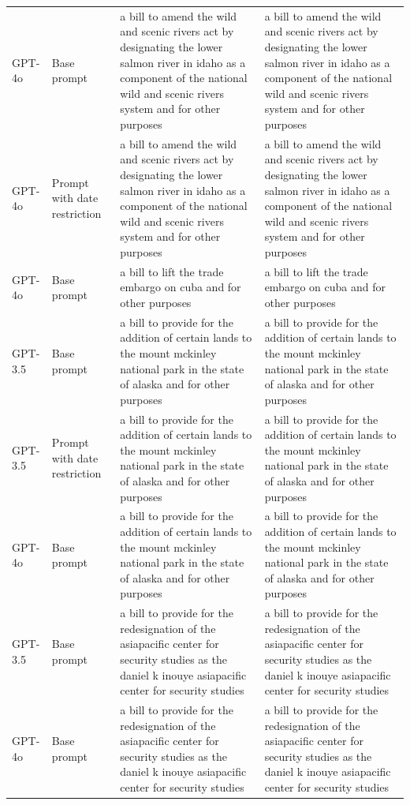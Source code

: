 \begin{longtable}{>{\raggedright\arraybackslash}p{1.4cm}>{\raggedright\arraybackslash}p{1.4cm}>{\raggedright\arraybackslash}p{5.5cm}>{\raggedright\arraybackslash}p{5.5cm}}
GPT-4o & Base prompt & a bill to amend the wild and scenic rivers act by designating the lower salmon river in idaho as a component of the national wild and scenic rivers system and for other purposes & a bill to amend the wild and scenic rivers act by designating the lower salmon river in idaho as a component of the national wild and scenic rivers system and for other purposes\\
GPT-4o & Prompt with date restriction & a bill to amend the wild and scenic rivers act by designating the lower salmon river in idaho as a component of the national wild and scenic rivers system and for other purposes & a bill to amend the wild and scenic rivers act by designating the lower salmon river in idaho as a component of the national wild and scenic rivers system and for other purposes\\
GPT-4o & Base prompt & a bill to lift the trade embargo on cuba and for other purposes & a bill to lift the trade embargo on cuba and for other purposes\\
GPT-3.5 & Base prompt & a bill to provide for the addition of certain lands to the mount mckinley national park in the state of alaska and for other purposes & a bill to provide for the addition of certain lands to the mount mckinley national park in the state of alaska and for other purposes\\
GPT-3.5 & Prompt with date restriction & a bill to provide for the addition of certain lands to the mount mckinley national park in the state of alaska and for other purposes & a bill to provide for the addition of certain lands to the mount mckinley national park in the state of alaska and for other purposes\\
GPT-4o & Base prompt & a bill to provide for the addition of certain lands to the mount mckinley national park in the state of alaska and for other purposes & a bill to provide for the addition of certain lands to the mount mckinley national park in the state of alaska and for other purposes\\
GPT-3.5 & Base prompt & a bill to provide for the redesignation of the asiapacific center for security studies as the daniel k inouye asiapacific center for security studies & a bill to provide for the redesignation of the asiapacific center for security studies as the daniel k inouye asiapacific center for security studies\\
GPT-4o & Base prompt & a bill to provide for the redesignation of the asiapacific center for security studies as the daniel k inouye asiapacific center for security studies & a bill to provide for the redesignation of the asiapacific center for security studies as the daniel k inouye asiapacific center for security studies\\

\end{longtable}
